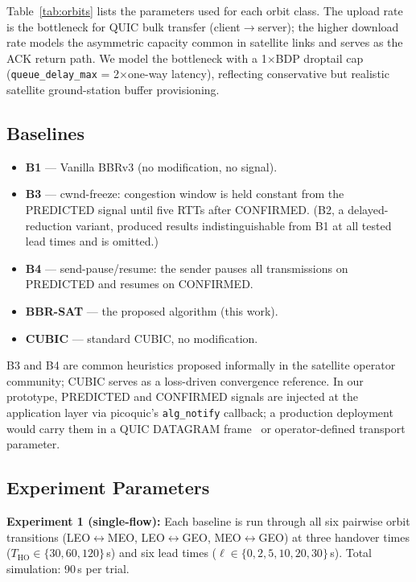 \documentclass[conference]{IEEEtran}
\begin{document}
Table~\ref{tab:orbits} lists the parameters used for each orbit class.
The upload rate is the bottleneck for QUIC bulk transfer (client$\to$server);
the higher download rate models the asymmetric capacity common in satellite
links and serves as the ACK return path.
We model the bottleneck with a 1$\times$BDP droptail cap
(\texttt{queue\_delay\_max} = 2$\times$one-way latency), reflecting
conservative but realistic satellite ground-station buffer provisioning.

\subsection{Baselines}

\begin{itemize}
  \item \textbf{B1} --- Vanilla BBRv3 (no modification, no signal).
  \item \textbf{B3} --- cwnd-freeze: congestion window is held constant
        from the PREDICTED signal until five RTTs after CONFIRMED.
        (B2, a delayed-reduction variant, produced results
        indistinguishable from B1 at all tested lead times and is omitted.)
  \item \textbf{B4} --- send-pause/resume: the sender pauses all
        transmissions on PREDICTED and resumes on CONFIRMED.
  \item \textbf{BBR-SAT} --- the proposed algorithm (this work).
  \item \textbf{CUBIC} --- standard CUBIC, no modification.
\end{itemize}

B3 and B4 are common heuristics proposed informally in the satellite
operator community; CUBIC serves as a loss-driven convergence reference.
In our prototype, PREDICTED and CONFIRMED signals are injected at the
application layer via picoquic's \texttt{alg\_notify} callback;
a production deployment would carry them in a QUIC DATAGRAM
frame~\cite{pauly2022rfc9221} or operator-defined transport parameter.

\subsection{Experiment Parameters}

\textbf{Experiment 1 (single-flow):}
Each baseline is run through all six pairwise orbit transitions
(LEO$\leftrightarrow$MEO, LEO$\leftrightarrow$GEO, MEO$\leftrightarrow$GEO)
at three handover times ($T_\mathrm{HO} \in \{30, 60, 120\}$\,s)
and six lead times ($\ell \in \{0, 2, 5, 10, 20, 30\}$\,s).
Total simulation: 90\,s per trial.
\end{document}

